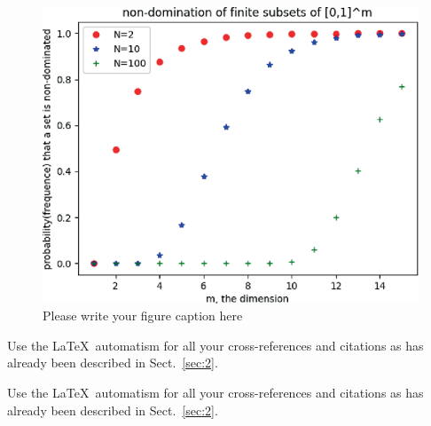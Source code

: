 \begin{figure}[t]
    \sidecaption[t]
    \includegraphics{figure}
    \caption{Please write your figure caption here}
    \label{fig:2}       %
\end{figure}

 Use the \LaTeX\ automatism for all your cross-references and citations as has already been described in Sect.~\ref{sec:2}.

 Use the \LaTeX\ automatism for all your cross-refer\-ences and citations as has already been described in Sect.~\ref{sec:2}.

